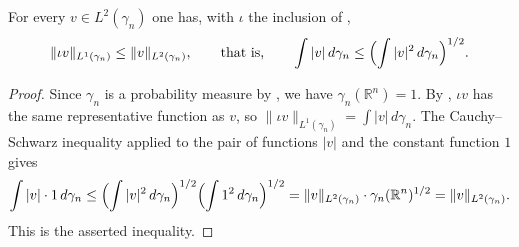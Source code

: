 \begin{lemma}
For every $v \in L^2(\gamma_n)$ one has, with $\iota$ the inclusion of
,
\[
  \|\iota v\|_{L^1(\gamma_n)} \leq \|v\|_{L^2(\gamma_n)},
  \qquad\text{that is,}\qquad
  \int |v| \, d\gamma_n \leq \Bigl(\int |v|^2 \, d\gamma_n\Bigr)^{1/2}.
\]
\end{lemma}
\begin{proof}
Since $\gamma_n$ is a probability measure by , we have
$\gamma_n(\mathbb{R}^n) = 1$.  By , $\iota v$ has the same
representative function as $v$, so
$\|\iota v\|_{L^1(\gamma_n)} = \int |v| \, d\gamma_n$.  The Cauchy--Schwarz
inequality applied to the pair of functions $|v|$ and the constant function $1$
gives
\[
  \int |v| \cdot 1 \, d\gamma_n
    \leq \Bigl(\int |v|^2 \, d\gamma_n\Bigr)^{1/2}
         \Bigl(\int 1^2 \, d\gamma_n\Bigr)^{1/2}
    = \|v\|_{L^2(\gamma_n)} \cdot \gamma_n(\mathbb{R}^n)^{1/2}
    = \|v\|_{L^2(\gamma_n)} .
\]
This is the asserted inequality.
\end{proof}

